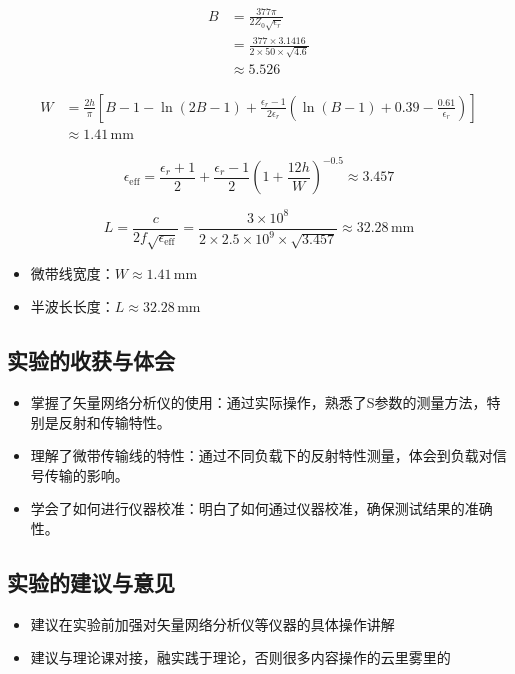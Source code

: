 \documentclass[12pt,a4paper,UTF8]{article}
\begin{document}
\begin{align*}
  B &= \frac{377\pi}{2Z_0\sqrt{\epsilon_r}} \\
    &= \frac{377 \times 3.1416}{2 \times 50 \times \sqrt{4.6}} \\
    &\approx 5.526
\end{align*}

\begin{align*}
  W &= \frac{2h}{\pi}\left[B - 1 - \ln(2B - 1) + \frac{\epsilon_r - 1}{2\epsilon_r}\left(\ln(B - 1) + 0.39 - \frac{0.61}{\epsilon_r}\right)\right] \\
    &\approx 1.41\,\text{mm}
\end{align*}

\begin{equation*}
  \epsilon_{\text{eff}} = \frac{\epsilon_r + 1}{2} + \frac{\epsilon_r - 1}{2}\left(1 + \frac{12h}{W}\right)^{-0.5} \approx 3.457
\end{equation*}

\begin{equation*}
  L = \frac{c}{2f\sqrt{\epsilon_{\text{eff}}}} = \frac{3 \times 10^8}{2 \times 2.5 \times 10^9 \times \sqrt{3.457}} \approx 32.28\,\text{mm}
\end{equation*}

\begin{itemize}
  \item 微带线宽度：$W \approx 1.41\,\text{mm}$
  \item 半波长长度：$L \approx 32.28\,\text{mm}$
\end{itemize}

\subsection{实验的收获与体会}
\begin{itemize}
  \item 掌握了矢量网络分析仪的使用：通过实际操作，熟悉了S参数的测量方法，特别是反射和传输特性。
  \item 理解了微带传输线的特性：通过不同负载下的反射特性测量，体会到负载对信号传输的影响。
  \item 学会了如何进行仪器校准：明白了如何通过仪器校准，确保测试结果的准确性。
\end{itemize}

\subsection{实验的建议与意见}
\begin{itemize}
  \item 建议在实验前加强对矢量网络分析仪等仪器的具体操作讲解
  \item 建议与理论课对接，融实践于理论，否则很多内容操作的云里雾里的
\end{itemize}
\end{document}
